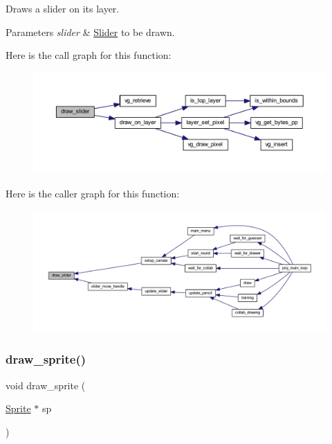 Draws a slider on its layer. 


\begin{DoxyParams}{Parameters}
{\em slider} & \mbox{\hyperlink{struct_slider}{Slider}} to be drawn. \\
\hline
\end{DoxyParams}
Here is the call graph for this function\+:\nopagebreak
\begin{figure}[H]
\begin{center}
\leavevmode
\includegraphics[width=350pt]{group__sprite_ga68e5ecf620b6fc346c992ef0eb49535f_cgraph}
\end{center}
\end{figure}
Here is the caller graph for this function\+:\nopagebreak
\begin{figure}[H]
\begin{center}
\leavevmode
\includegraphics[width=350pt]{group__sprite_ga68e5ecf620b6fc346c992ef0eb49535f_icgraph}
\end{center}
\end{figure}
\mbox{\label{group__sprite_ga740994f8c16c38bf18eaabac1f5eeeb9}} 
\subsubsection{\texorpdfstring{draw\+\_\+sprite()}{draw\_sprite()}}
{\footnotesize\ttfamily void draw\+\_\+sprite (\begin{DoxyParamCaption}\item[{\mbox{\hyperlink{struct_sprite}{Sprite}} $\ast$}]{sp }\end{DoxyParamCaption})}



